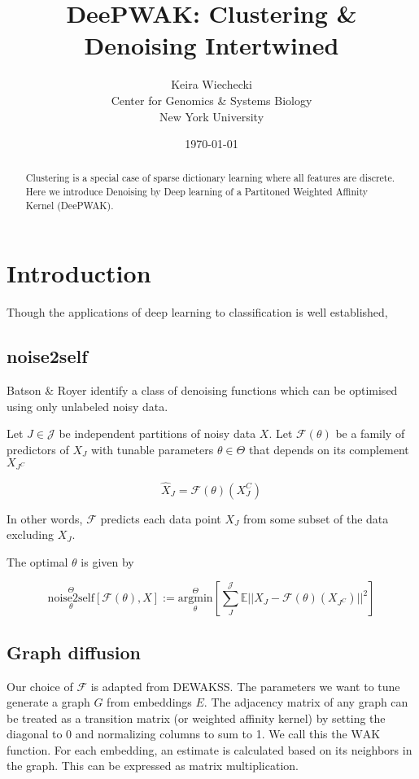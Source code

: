 \documentclass{article}
\date{\today}
\title{DeePWAK: Clustering \& Denoising Intertwined}
\author{Keira Wiechecki \\
  Center for Genomics \& Systems Biology \\
  New York University \\
}
\begin{document}
\maketitle

\begin{abstract}
  Clustering is a special case of sparse dictionary learning where all features are discrete.
Here we introduce Denoising by Deep learning of a Partitoned Weighted Affinity Kernel (DeePWAK). 
\end{abstract}

\section{Introduction}
Though the applications of deep learning to classification is well established,

\subsection{noise2self}

Batson \& Royer\cite{batson2019noise2self} identify a class of denoising functions which can be optimised using only unlabeled noisy data.

Let $J \in \mathcal{J}$ be independent partitions of noisy data $X$. Let $\mathcal{F}(\theta)$ be a family of predictors of $X_J$ with tunable parameters $\theta \in \Theta$ that depends on its complement $X_{J^C}$

\begin{equation}
  \hat{X}_J=\mathcal{F}(\theta)(X_J^C)
\end{equation}

In other words, $\mathcal{F}$ predicts each data point $X_J$ from some subset of the data excluding $X_J$. 

  The optimal $\theta$ is given by

\begin{equation}
  \underset{\theta}{\overset{\Theta}{\mathrm{noise2self}}}[\mathcal{F}(\theta),X] := \underset{\theta}{\overset{\Theta}{\mathrm{argmin}}}[\sum_{J}^{\mathcal{J}}\mathbb{E}||X_J-\mathcal{F}(\theta)(X_{J^C})||^2]
\end{equation}



\subsection{Graph diffusion}

Our choice of $\mathcal{F}$ is adapted from DEWAKSS\cite{tjarnberg2021}. The parameters we want to tune generate a graph $G$ from embeddings $E$. The adjacency matrix of any graph can be treated as a transition matrix (or weighted affinity kernel) by setting the diagonal to 0 and normalizing columns to sum to 1. We call this the $\mathrm{WAK}$ function. For each embedding, an estimate is calculated based on its neighbors in the graph. This can be expressed as matrix multiplication.
\end{document}
